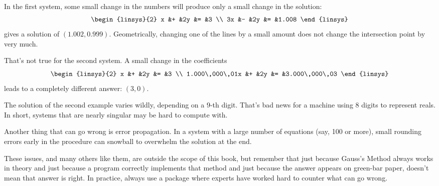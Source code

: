 In the first system, some small change in the numbers will produce only a
small change in the solution:
\begin{equation*}
 \begin{linsys}{2}
  x  &+  &2y &= &3                  \\
  3x &-  &2y &= &1.008
 \end{linsys}
\end{equation*}
gives a solution of \( (1.002,0.999) \).
Geometrically, changing one of the lines by a small amount does not change
the intersection point by very much.

That's not true for the second system.
A small change in the coefficients
\begin{equation*}
 \begin{linsys}{2}
   x              &+ &2y  &=  &3                  \\
  1.000\,000\,01x &+ &2y  &=  &3.000\,000\,03
 \end{linsys}
\end{equation*}
leads to a completely different answer: \( (3,0) \).

The solution of the second example
varies wildly, depending on a \( 9 \)-th digit.
That's bad news for a machine using \( 8 \) digits to represent reals.
In short, systems that are nearly singular may be hard
to compute with.

Another thing that can go wrong is error propagation.
In a system with a large number of equations (say, 100 or more), small
rounding errors early in the procedure can snowball to overwhelm the
solution at the end.

These issues, and many others like them,
are outside the scope of this book, but remember that
just because Gauss's Method always works in theory and just
because a program correctly implements that method
and just because the answer appears on green-bar paper, doesn't
mean that answer is right.
In practice, always use a package
where experts have worked hard to counter what can go wrong.
%

